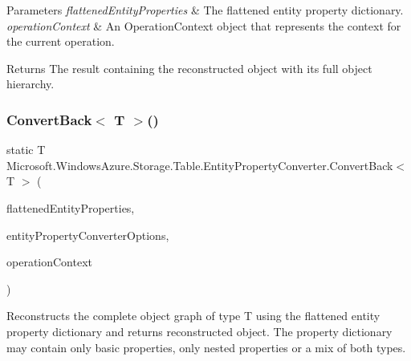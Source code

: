\begin{DoxyParams}{Parameters}
{\em flattened\+Entity\+Properties} & The flattened entity property dictionary.\\
\hline
{\em operation\+Context} & An Operation\+Context object that represents the context for the current operation.\\
\hline
\end{DoxyParams}
\begin{DoxyReturn}{Returns}
The result containing the reconstructed object with its full object hierarchy.
\end{DoxyReturn}
\mbox{\label{classMicrosoft_1_1WindowsAzure_1_1Storage_1_1Table_1_1EntityPropertyConverter_a3beb7c8638a8f6a84bd16c0f0a00521d_a3beb7c8638a8f6a84bd16c0f0a00521d}} 
\subsubsection{\texorpdfstring{Convert\+Back$<$ T $>$()}{ConvertBack< T >()}\hspace{0.1cm}{\footnotesize\ttfamily [2/2]}}
{\footnotesize\ttfamily static T Microsoft.\+Windows\+Azure.\+Storage.\+Table.\+Entity\+Property\+Converter.\+Convert\+Back$<$ T $>$ (\begin{DoxyParamCaption}\item[{I\+Dictionary$<$ string, Entity\+Property $>$}]{flattened\+Entity\+Properties,  }\item[{Entity\+Property\+Converter\+Options}]{entity\+Property\+Converter\+Options,  }\item[{Operation\+Context}]{operation\+Context }\end{DoxyParamCaption})\hspace{0.3cm}{\ttfamily [static]}}



Reconstructs the complete object graph of type T using the flattened entity property dictionary and returns reconstructed object. The property dictionary may contain only basic properties, only nested properties or a mix of both types. 


